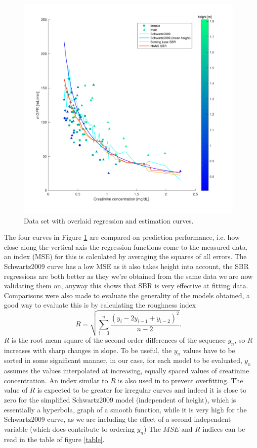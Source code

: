 \documentclass[10pt,final]{siamltex}
\begin{document}
\begin{figure}[ht]
  \centering
  \includegraphics[scale=0.6]{figures/regression}
  \caption{Data set with overlaid regression and estimation curves. }
  \label{regression}
\end{figure}

The four curves in Figure \ref{regression} are compared on prediction performance, i.e. how close along the vertical axis the regression functions come to the measured data, an index (MSE) for this is calculated by averaging the squares of all errors. The Schwartz2009 curve has a low MSE as it also takes height into account, the SBR regressions are both better as they we're obtained from the same data we are now validating them on, anyway this shows that SBR is very effective at fitting data.
Comparisons were also made to evaluate the generality of the models obtained, a good way to evaluate this is by calculating the roughness index
$$ R = \sqrt{\sum_{i=3}^{n}{\frac{(y_i-2y_{i-1}+y_{i-2})^2}{n-2}}}.$$
$R$ is the root mean square of the second order differences of the sequence $y_n$, so $R$ increases with sharp changes in slope. To be useful, the $y_n$ values have to be sorted in some significant manner, in our case, for each model to be evaluated, $y_n$ assumes the values interpolated at increasing, equally spaced values of creatinine concentration. An index similar to $R$ is also used in \cite{bishop} to prevent overfitting.
The value of $R$ is expected to be greater for irregular curves and indeed it is close to zero for the simplified Schwartz2009 model (independent of height), which is essentially a hyperbola, graph of a smooth function, while it is very high for the Schwartz2009 curve, as we are including the effect of a second independent variable (which does contribute to ordering $y_n$)
The $MSE$ and $R$ indices can be read in the table of figure \ref{table}.
\end{document}
